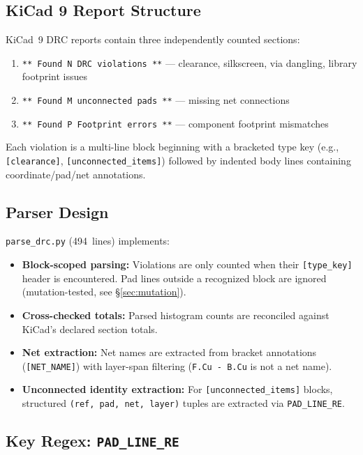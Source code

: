 \documentclass[11pt,a4paper]{article}
\begin{document}
\subsection{KiCad 9 Report Structure}

KiCad~9 DRC reports contain three independently counted sections:

\begin{enumerate}
    \item \texttt{** Found N DRC violations **} --- clearance, silkscreen,
          via dangling, library footprint issues
    \item \texttt{** Found M unconnected pads **} --- missing net connections
    \item \texttt{** Found P Footprint errors **} --- component footprint mismatches
\end{enumerate}

Each violation is a multi-line block beginning with a bracketed type key
(e.g., \texttt{[clearance]}, \texttt{[unconnected\_items]}) followed by
indented body lines containing coordinate/pad/net annotations.

\subsection{Parser Design}

\texttt{parse\_drc.py} (494~lines) implements:

\begin{itemize}
    \item \textbf{Block-scoped parsing:} Violations are only counted when their
          \texttt{[type\_key]} header is encountered. Pad lines outside a
          recognized block are ignored (mutation-tested, see \S\ref{sec:mutation}).
    \item \textbf{Cross-checked totals:} Parsed histogram counts are reconciled
          against KiCad's declared section totals.
    \item \textbf{Net extraction:} Net names are extracted from bracket annotations
          (\texttt{[NET\_NAME]}) with layer-span filtering (\texttt{F.Cu - B.Cu}
          is not a net name).
    \item \textbf{Unconnected identity extraction:} For \texttt{[unconnected\_items]}
          blocks, structured \texttt{(ref, pad, net, layer)} tuples are extracted
          via \texttt{PAD\_LINE\_RE}.
\end{itemize}

\subsection{Key Regex: \texttt{PAD\_LINE\_RE}}
\end{document}
